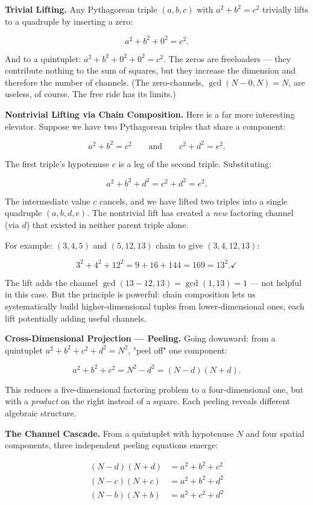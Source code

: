 \textbf{Trivial Lifting.} Any Pythagorean triple $(a, b, c)$ with $a^2 + b^2 = c^2$ trivially lifts to a quadruple by inserting a zero:

\[a^2 + b^2 + 0^2 = c^2.\]

And to a quintuplet: $a^2 + b^2 + 0^2 + 0^2 = c^2$. The zeros are freeloaders --- they contribute nothing to the sum of squares, but they increase the dimension and therefore the number of channels. (The zero-channels, $\gcd(N - 0, N) = N$, are useless, of course. The free ride has its limits.)

\textbf{Nontrivial Lifting via Chain Composition.} Here is a far more interesting elevator. Suppose we have two Pythagorean triples that share a component:

\[a^2 + b^2 = c^2 \qquad \text{and} \qquad c^2 + d^2 = e^2.\]

The first triple's hypotenuse $c$ is a leg of the second triple. Substituting:

\[a^2 + b^2 + d^2 = c^2 + d^2 = e^2.\]

The intermediate value $c$ cancels, and we have lifted two triples into a single quadruple $(a, b, d, e)$. The nontrivial lift has created a \textit{new} factoring channel (via $d$) that existed in neither parent triple alone.

For example: $(3, 4, 5)$ and $(5, 12, 13)$ chain to give $(3, 4, 12, 13)$:

\[3^2 + 4^2 + 12^2 = 9 + 16 + 144 = 169 = 13^2. \checkmark\]

The lift adds the channel $\gcd(13 - 12, 13) = \gcd(1, 13) = 1$ --- not helpful in this case. But the principle is powerful: chain composition lets us systematically build higher-dimensional tuples from lower-dimensional ones, each lift potentially adding useful channels.

\textbf{Cross-Dimensional Projection --- Peeling.} Going downward: from a quintuplet $a^2 + b^2 + c^2 + d^2 = N^2$, "peel off" one component:

\[a^2 + b^2 + c^2 = N^2 - d^2 = (N - d)(N + d).\]

This reduces a five-dimensional factoring problem to a four-dimensional one, but with a \textit{product} on the right instead of a square. Each peeling reveals different algebraic structure.

\textbf{The Channel Cascade.} From a quintuplet with hypotenuse $N$ and four spatial components, three independent peeling equations emerge:

\[\begin{aligned}
(N - d)(N + d) &= a^2 + b^2 + c^2 \\
(N - c)(N + c) &= a^2 + b^2 + d^2 \\
(N - b)(N + b) &= a^2 + c^2 + d^2
\end{aligned}\]

